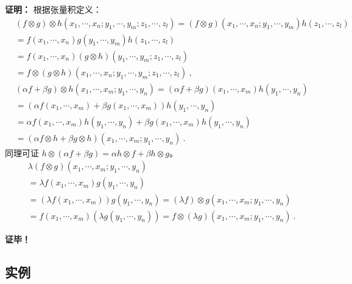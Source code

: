 \textbf{证明：}
根据张量积定义：
\begin{equation}
\begin{aligned}
&(f\otimes g)\otimes h(x_1,\cdots,x_n;y_1,\cdots,y_m;z_1,\cdots,z_l)=(f\otimes g)(x_1,\cdots,x_n;y_1,\cdots,y_m)h(z_1,\cdots,z_l)\\
&=f(x_1,\cdots,x_n)g(y_1,\cdots,y_m)h(z_1,\cdots,z_l)\\
&=f(x_1,\cdots,x_n)(g\otimes h)(y_1,\cdots,y_m;z_1,\cdots,z_l)\\
&=f\otimes(g\otimes h)(x_1,\cdots,x_n;y_1,\cdots,y_m;z_1,\cdots,z_l)~,
\end{aligned}
\end{equation}
\begin{equation}
\begin{aligned}
&(\alpha f+\beta g)\otimes h(x_1,\cdots,x_m;y_1,\cdots,y_n)=(\alpha f+\beta g)(x_1,\cdots,x_m)h(y_1,\cdots,y_n)\\
&=(\alpha f(x_1,\cdots,x_m)+\beta g(x_1,\cdots,x_m))h(y_1,\cdots,y_n)\\
&=\alpha f(x_1,\cdots,x_m)h(y_1,\cdots,y_n)+\beta g(x_1,\cdots,x_m)h(y_1,\cdots,y_n)\\
&=(\alpha f\otimes h+\beta g\otimes h)(x_1,\cdots,x_m;y_1,\cdots,y_n)~.
\end{aligned}
\end{equation}
同理可证 $h\otimes(\alpha f+\beta g)=\alpha h\otimes f+\beta h\otimes g$。
\begin{equation}
\begin{aligned}
&\lambda (f\otimes g)(x_1,\cdots,x_m;y_1,\cdots,y_n)\\
&=\lambda f(x_1,\cdots,x_m)g(y_1,\cdots,y_n)\\
&=(\lambda f(x_1,\cdots,x_m))g(y_1,\cdots,y_n)=(\lambda f)\otimes g(x_1,\cdots,x_m;y_1,\cdots,y_n)\\
&= f(x_1,\cdots,x_m)(\lambda g(y_1,\cdots,y_n))=f\otimes(\lambda g)(x_1,\cdots,x_m;y_1,\cdots,y_n)~.
\end{aligned}
\end{equation}

\textbf{证毕！}
\subsection{实例}


